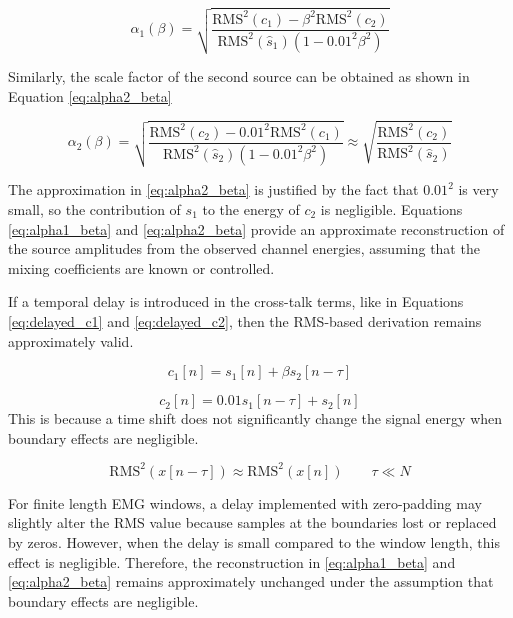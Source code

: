 \begin{equation}
\alpha_1(\beta)
=
\sqrt{
\frac{
\mathrm{RMS}^2(c_1)
-
\beta^2\mathrm{RMS}^2(c_2)
}
{
\mathrm{RMS}^2(\hat{s}_1)\left(1-0.01^2\beta^2\right)
}
}
\label{eq:alpha1_beta}
\end{equation}

Similarly, the scale factor of the second source can be obtained as shown in Equation \ref{eq:alpha2_beta}

\begin{equation}
\alpha_2(\beta)
=
\sqrt{
\frac{
\mathrm{RMS}^2(c_2)
-
0.01^2\mathrm{RMS}^2(c_1)
}
{
\mathrm{RMS}^2(\hat{s}_2)\left(1-0.01^2\beta^2\right)
}
}
\approx
\sqrt{
\frac{
\mathrm{RMS}^2(c_2)
}
{
\mathrm{RMS}^2(\hat{s}_2)
}
}
\label{eq:alpha2_beta}
\end{equation}

The approximation in \ref{eq:alpha2_beta} is justified by the fact that $0.01^2$ is very small, so the contribution of $s_1$ to the energy of $c_2$ is negligible. Equations \ref{eq:alpha1_beta} and \ref{eq:alpha2_beta} provide an approximate reconstruction of the source amplitudes from the observed channel energies, assuming that the mixing coefficients are known or controlled.

If a temporal delay is introduced in the cross-talk terms, like in Equations \ref{eq:delayed_c1} and \ref{eq:delayed_c2}, then the RMS-based derivation remains approximately valid.

\begin{equation}
c_1[n]=s_1[n]+\beta s_2[n-\tau]
\label{eq:delayed_c1}
\end{equation}

\begin{equation}
c_2[n]=0.01s_1[n-\tau]+s_2[n]
\label{eq:delayed_c2}
\end{equation}
This is because a time shift
does not significantly change the signal energy when boundary effects are
negligible. 

\begin{equation}
\mathrm{RMS}^2(x[n-\tau]) \approx \mathrm{RMS}^2(x[n])
\qquad \tau \ll N
\label{eq:rms_delay_approx}
\end{equation}

For finite length EMG windows, a delay implemented with zero-padding may slightly
alter the RMS value because samples at the boundaries lost or replaced by
zeros. However, when the delay is small compared to the window length, this
effect is negligible. Therefore, the reconstruction in
\ref{eq:alpha1_beta} and \ref{eq:alpha2_beta} remains approximately unchanged under the assumption that boundary effects are negligible.

